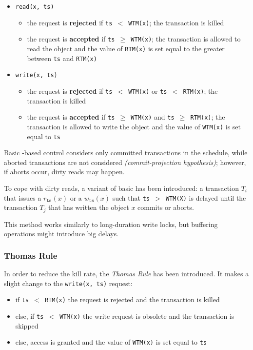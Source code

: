 \documentclass[english]{article}
\begin{document}
\begin{itemize}
  \item \texttt{read(x, ts)}
        \begin{itemize}
          \item the request is \textbf{rejected} if \texttt{ts \(<\) WTM(x)}; the transaction is killed
          \item the request is \textbf{accepted} if \texttt{ts \(\geq\) WTM(x)}; the transaction is allowed to read the object and the value of \texttt{RTM(x)} is set equal to the greater between \texttt{ts} and \texttt{RTM(x)}
        \end{itemize}
  \item \texttt{write(x, ts)}
        \begin{itemize}
          \item the request is \textbf{rejected} if \texttt{ts \(<\) WTM(x)} or \texttt{ts \(<\) RTM(x)}; the transaction is killed
          \item the request is \textbf{accepted} if \texttt{ts \(\geq\) WTM(x)} and \texttt{ts \(\geq\) RTM(x)}; the transaction is allowed to write the object and the value of \texttt{WTM(x)} is set equal to \texttt{ts}
        \end{itemize}
\end{itemize}

\bigskip
Basic \TS-based control considers only committed transactions in the schedule, while aborted transactions are not considered \textit{(commit-projection hypothesis)};
however, if aborts occur, dirty reads may happen.

To cope with dirty reads, a variant of basic \TS has been introduced: a transaction \(T_i\) that issues a \(r_{\texttt{ts}}(x)\) or a \(w_{\texttt{ts}}(x)\) such that \texttt{ts \(>\) WTM(X)} is delayed until the transaction \(T_j\) that has written the object \(x\) commits or aborts.

This method works similarly to long-duration write locks, but buffering operations might introduce big delays.

\subsubsection{Thomas Rule}

In order to reduce the kill rate, the \textit{Thomas Rule} has been introduced.
It makes a slight change to the \texttt{write(x, ts)} request:

\begin{itemize}
  \item if \texttt{ts \(<\) RTM(x)} the request is rejected and the transaction is killed
  \item else, if \texttt{ts \(<\) WTM(x)} the write request is obsolete and the transaction is skipped
  \item else, access is granted and the value of \texttt{WTM(x)} is set equal to \texttt{ts}
\end{itemize}
\end{document}
